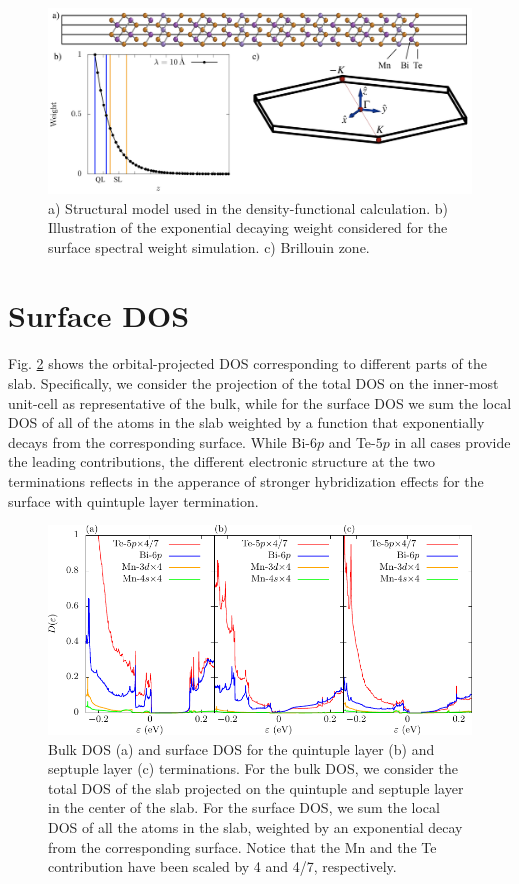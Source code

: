 \documentclass[showpacs, preprintnumbers, pra, superscriptaddress, floatfix, onecolumn, longbibliography]{revtex4-1}
\begin{document}
\begin{figure}[h!]
 \centering
 \includegraphics[width=14 cm]{structural_data.png}
	\caption{a) Structural model used in the density-functional calculation. b) Illustration of the exponential decaying weight considered for the surface spectral weight simulation. c) Brillouin zone.} 
	\label{dft_structure}
\end{figure}

\section{Surface DOS}

Fig. \ref{dft_dos} shows the orbital-projected DOS corresponding to different parts of the slab. Specifically, we consider the projection of the total DOS on the inner-most unit-cell as representative of the bulk, while for the surface DOS we sum the local DOS of all of the atoms in the slab weighted by a function that  exponentially decays from the corresponding surface.
While Bi-$6p$ and Te-$5p$ in all cases provide the leading contributions, the different electronic structure at the two terminations reflects in the apperance of stronger hybridization effects for the surface with quintuple layer termination.

\begin{figure}[h!]
 \centering
 \includegraphics[width=15 cm]{dos.pdf}
	\caption{ Bulk DOS (a) and surface DOS for the quintuple layer (b) and septuple layer (c) terminations. For the bulk DOS, we consider the total DOS of the slab projected on the quintuple and septuple layer in the center of the slab.  For the surface DOS, we sum the local DOS of all the atoms in the slab, weighted by an exponential decay from the corresponding surface. Notice that the Mn and the Te contribution have been scaled by 4 and 4/7, respectively.	
}
	\label{dft_dos}
\end{figure}
\end{document}
